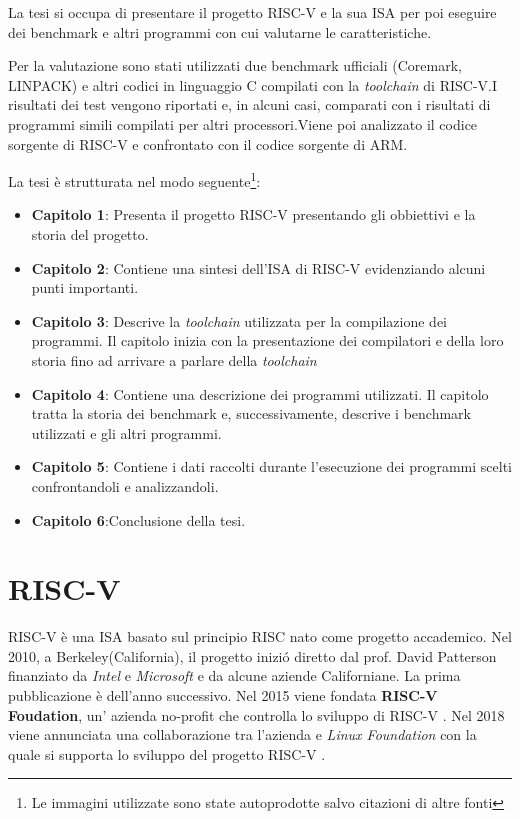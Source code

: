 \documentclass[12pt, a4paper]{report}
\begin{document}
La tesi si occupa di presentare il progetto RISC-V e la sua ISA per poi eseguire dei benchmark e altri programmi con cui valutarne le caratteristiche.

Per la valutazione sono stati utilizzati due benchmark ufficiali (Coremark, LINPACK) e altri
codici in linguaggio C compilati con la \textit{toolchain} di RISC-V.I risultati dei test vengono riportati e, in alcuni casi, comparati con i risultati di programmi simili compilati per altri processori.Viene poi analizzato il codice sorgente di RISC-V e confrontato con il codice sorgente di ARM.

La tesi è strutturata nel modo seguente\footnote{Le immagini utilizzate sono state autoprodotte salvo citazioni di altre fonti}:
\begin{itemize}
\item \textbf{Capitolo 1}: Presenta il progetto RISC-V presentando gli obbiettivi e la storia del progetto.
\item \textbf{Capitolo 2}: Contiene una sintesi dell'ISA di RISC-V evidenziando alcuni punti importanti.
\item \textbf{Capitolo 3}: Descrive la \textit{toolchain} utilizzata per la compilazione dei programmi. Il capitolo inizia con la presentazione dei compilatori e della loro storia fino ad arrivare a parlare della \textit{toolchain}
\item \textbf{Capitolo 4}: Contiene una descrizione dei programmi utilizzati. Il capitolo tratta la storia dei benchmark e, successivamente, descrive i benchmark utilizzati e gli altri programmi.
\item \textbf{Capitolo 5}: Contiene i dati raccolti durante l'esecuzione dei programmi scelti confrontandoli e analizzandoli.
\item \textbf{Capitolo 6}:Conclusione della tesi. 
\end{itemize}



\chapter{RISC-V}
RISC-V è una ISA basato sul principio RISC nato come progetto accademico. Nel 2010, a Berkeley(California), il progetto inizi\'o diretto dal prof. David Patterson finanziato da \textit{Intel } e \textit{Microsoft} e da alcune aziende Californiane. La prima pubblicazione è dell'anno successivo. Nel 2015 viene fondata \textbf{RISC-V Foudation}, un' azienda no-profit che controlla lo sviluppo di RISC-V \cite{RISCVHistory}. Nel 2018 viene annunciata una collaborazione tra l'azienda e \textit{Linux Foundation} con la quale si supporta lo sviluppo del progetto RISC-V \cite{RISCOrgHistory}.
\end{document}
